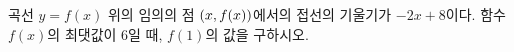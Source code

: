 곡선 $y=f(x)$ 위의 임의의 점 $(x{,}\mkern3mu\mathopen{}f(x))$에서의 접선의 기울기가 $-2x+8$이다. 함수 $f(x)$의 최댓값이 6일 때, $f(1)$의 값을 구하시오.
